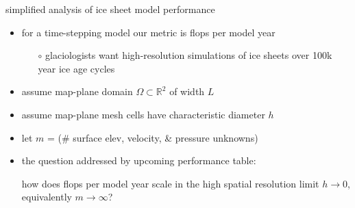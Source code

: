 \documentclass[svgnames,
               hyperref={colorlinks,citecolor=DeepPink4,linkcolor=FireBrick,urlcolor=Maroon},
               usepdftitle=false]  %
               {beamer}
\newcommand{\RR}{\mathbb{R}}
\begin{document}
\begin{frame}{simplified analysis of ice sheet model performance}

\begin{itemize}
\item for a time-stepping model our metric is \alert{flops per model year}
    \begin{itemize}
    \item[$\circ$] glaciologists want high-resolution simulations of ice sheets over 100k year ice age cycles
    \end{itemize}
\item assume map-plane domain $\Omega \subset \RR^2$ of width $L$
\item assume map-plane mesh cells have characteristic diameter $h$
\item let $m$ = (\# surface elev, velocity, \& pressure unknowns)
\item the question addressed by upcoming performance table:

\bigskip
\begin{center}
\begin{minipage}{0.82\textwidth}
how does flops per model year \alert{scale} in the \alert{high spatial resolution limit} $h\to 0$, equivalently $m\to \infty$?
\end{minipage}
\end{center}
\end{itemize}
\end{frame}
\end{document}
